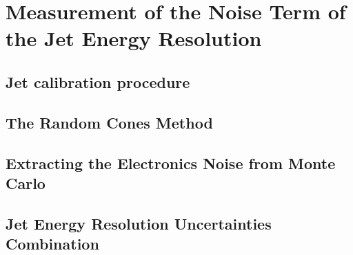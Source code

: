 \chapter{Measurement of the Noise Term of the Jet Energy Resolution}
\label{chap:calibration}

\section{Jet calibration procedure}
\section{The Random Cones Method}
\section{Extracting the Electronics Noise from Monte Carlo}
\section{Jet Energy Resolution Uncertainties Combination}
